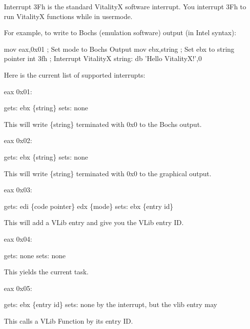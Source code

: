 Interrupt 3\+Fh is the standard VitalityX software interrupt. You interrupt 3\+Fh to run VitalityX functions while in usermode.

For example, to write to Bochs (emulation software) output (in Intel syntax)\+: 
\begin{DoxyCode}
        mov eax,0x01 ; Set mode to Bochs Output
        mov ebx,string ; Set ebx to string pointer
        int 3fh ; Interrupt VitalityX
string: db 'Hello VitalityX!',0
\end{DoxyCode}


Here is the current list of supported interrupts\+:


\begin{DoxyCode}
eax 0x01:

gets:
ebx \{string\}
sets:
none

This will write \{string\} terminated with 0x0 to the Bochs output.

eax 0x02:

gets:
ebx \{string\}
sets:
none

This will write \{string\} terminated with 0x0 to the graphical output.

eax 0x03:

gets:
edi \{code pointer\}
edx \{mode\}
sets:
ebx \{entry id\}

This will add a VLib entry and give you the VLib entry ID.

eax 0x04:

gets:
none
sets:
none

This yields the current task.

eax 0x05:

gets:
ebx \{entry id\}
sets:
none by the interrupt, but the vlib entry may

This calls a VLib Function by its entry ID.
\end{DoxyCode}
 